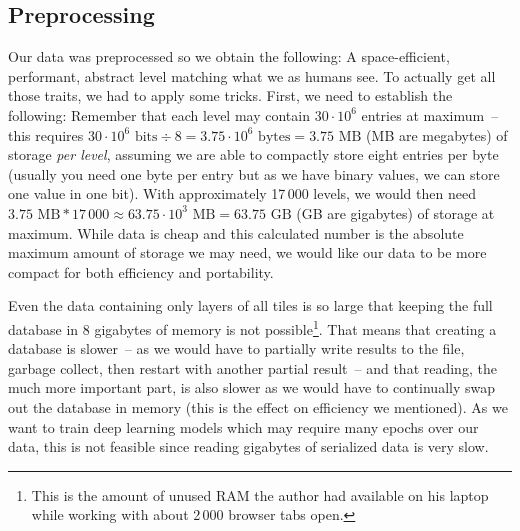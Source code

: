 \subsection{Preprocessing}
\label{sec:preprocessing}

Our data was preprocessed so we obtain the following: A
space-efficient, performant, abstract level matching what we as humans
see. To actually get all those traits, we had to apply some tricks.
First, we need to establish the following: Remember that each level
may contain $30 \cdot 10^{6}$ entries at maximum~-- this requires
$30 \cdot 10^{6}\text{ bits} \div 8 = 3.75 \cdot 10^{6}\text{ bytes} =
3.75\text{ MB}$ (MB are megabytes) of storage \emph{per level},
assuming we are able to compactly store eight entries per byte
(usually you need one byte per entry but as we have binary values, we
can store one value in one bit). With approximately 17\,000 levels, we
would then need
$3.75\text{ MB} * 17\,000 \approx 63.75 \cdot 10^{3}\text{ MB} =
63.75\text{ GB}$ (GB are gigabytes) of storage at maximum. While data
is cheap and this calculated number is the absolute maximum amount of
storage we may need, we would like our data to be more compact for
both efficiency and portability.

Even the data containing only layers of all tiles is so large that
keeping the full database in 8 gigabytes of memory is not
possible\footnote{This is the amount of unused RAM the author had
  available on his laptop while working with about 2\,000 browser tabs
  open.}. That means that creating a database is slower~-- as we would
have to partially write results to the file, garbage collect, then
restart with another partial result~-- and that reading, the much more
important part, is also slower as we would have to continually swap
out the database in memory (this is the effect on efficiency we
mentioned). As we want to train deep learning models which may require
many epochs over our data, this is not feasible since reading
gigabytes of serialized data is very slow.

